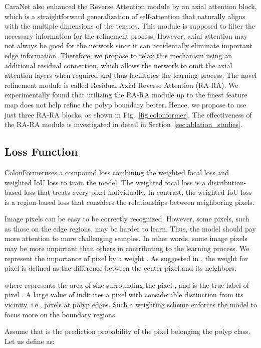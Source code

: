 \documentclass{article}
\newcommand{\ModelName}{ColonFormer}
\begin{document}
{CaraNet \cite{caranet} also enhanced the Reverse Attention module by an axial attention block, which is a straightforward generalization of self-attention that naturally aligns with the multiple dimensions of the tensors. This module is supposed to filter the necessary information for the refinement process. However, axial attention may not always be good for the network since it can accidentally eliminate important edge information. Therefore, we propose to relax this mechanism using an additional residual connection, which allows the network to omit the axial attention layers when required and thus facilitates the learning process. The novel refinement module is called Residual Axial Reverse Attention (RA-RA). We experimentally found that utilizing the RA-RA module up to the finest feature map does not help refine the polyp boundary better. Hence, we propose to use just three RA-RA blocks, as shown in Fig.~\ref{fig:colonformer}. The effectiveness of the RA-RA module is investigated in detail in Section~\ref{sec:ablation_studies}.





\subsection{Loss Function}
\ModelName uses a compound loss combining the weighted focal loss and weighted IoU loss to train the model. The weighted focal loss is a distribution-based loss that treats every pixel individually. In contrast, the weighted IoU loss is a region-based loss that considers the relationships between neighboring pixels.

Image pixels can be easy to be correctly recognized. However, some pixels, such as those on the edge regions, may be harder to learn. Thus, the model should pay more attention to more challenging samples. In other words, some image pixels may be more important than others in contributing to the learning process. We represent the importance of pixel  by a weight . As suggested in \cite{f3net}, the weight  for pixel  is defined as the difference between the center pixel and its neighbors: 

where  represents the area of  size surrounding the pixel , and  is the true label of pixel . A large value of  indicates a pixel with considerable distinction from its vicinity, i.e., pixels at polyp edges. Such a weighting scheme enforces the model to focus more on the boundary regions. 

Assume that  is the prediction probability of the pixel  belonging the polyp class. Let us define  as:


}
\end{document}
